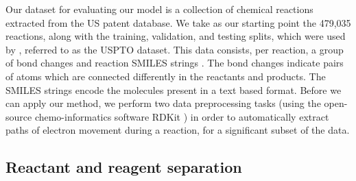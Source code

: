 

Our dataset for evaluating our model is a collection of chemical reactions extracted from the US patent database\citep{lowe2012extraction,Lowe2017}.
We take as our starting point the 479,035 reactions, along with the training, validation, and testing splits, 
which were used by \citet{jin2017predicting}, referred to as the USPTO dataset.
This data consists, per reaction, a group of bond changes and reaction SMILES strings \citep{weininger1988smiles}.
The bond changes indicate pairs of atoms which are connected differently in the reactants and products.
The SMILES strings encode the molecules present in a text based format.
Before we can apply our method, we perform two data preprocessing tasks 
(using the open-source chemo-informatics software RDKit \citep{rdkit}) 
in order to automatically extract paths of electron movement during a reaction, 
for a significant subset of the data.

\subsection{Reactant and reagent separation}

